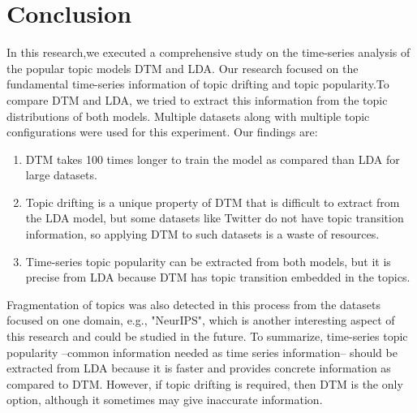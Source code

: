 \chapter{Conclusion}
In this research,we executed a comprehensive study on the time-series analysis of the popular topic models DTM and LDA. Our research focused on the fundamental time-series information of topic drifting and topic popularity.To compare DTM and LDA, we tried to extract this information from the topic distributions of both models. Multiple datasets along with multiple topic configurations were used for this experiment. Our findings are:

\begin{enumerate}
\item DTM takes 100 times longer to train the model as compared than LDA for large datasets.

\item Topic drifting is a unique property of DTM that is difficult to extract from the LDA model, but some datasets like Twitter do not have topic transition information, so applying DTM to such datasets is a waste of resources.

\item Time-series topic popularity can be extracted from both models, but it is precise from LDA because DTM has topic transition embedded in the topics.
\end{enumerate}

 Fragmentation of topics was also detected in this process from the datasets focused on one domain, e.g., "NeurIPS", which is another interesting aspect of this research and could be studied in the future. To summarize, time-series topic popularity --common information needed as time series information-- should be extracted from LDA because it is faster and provides concrete information as compared to DTM. However, if topic drifting is required, then DTM is the only option, although it sometimes may give inaccurate information.